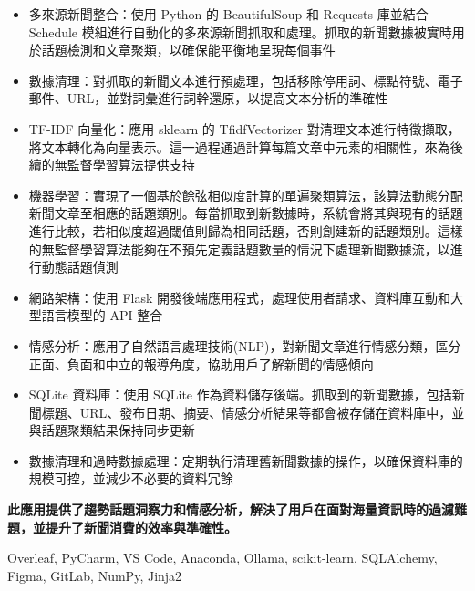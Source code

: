 \documentclass[11 pt,oneside,a4paper,titlepage]{article}
\begin{document}
{\begin{minipage}{20.4cm}
    {\begin{multicols}{2}
    \begin{itemize}[label=\Large\textbullet, left=0pt]
        \item 多來源新聞整合：使用 Python 的 BeautifulSoup 和 Requests 庫並結合 Schedule 模組進行自動化的多來源新聞抓取和處理。抓取的新聞數據被實時用於話題檢測和文章聚類，以確保能平衡地呈現每個事件
        \item 數據清理：對抓取的新聞文本進行預處理，包括移除停用詞、標點符號、電子郵件、URL，並對詞彙進行詞幹還原，以提高文本分析的準確性
        \item TF-IDF 向量化：應用 sklearn 的 TfidfVectorizer 對清理文本進行特徵擷取，將文本轉化為向量表示。這一過程通過計算每篇文章中元素的相關性，來為後續的無監督學習算法提供支持
        \item 機器學習：實現了一個基於餘弦相似度計算的單遍聚類算法，該算法動態分配新聞文章至相應的話題類別。每當抓取到新數據時，系統會將其與現有的話題進行比較，若相似度超過閾值則歸為相同話題，否則創建新的話題類別。這樣的無監督學習算法能夠在不預先定義話題數量的情況下處理新聞數據流，以進行動態話題偵測
        \item 網路架構：使用 Flask 開發後端應用程式，處理使用者請求、資料庫互動和大型語言模型的 API 整合
        \item 情感分析：應用了自然語言處理技術(NLP)，對新聞文章進行情感分類，區分正面、負面和中立的報導角度，協助用戶了解新聞的情感傾向
        \item SQLite 資料庫：使用 SQLite 作為資料儲存後端。抓取到的新聞數據，包括新聞標題、URL、發布日期、摘要、情感分析結果等都會被存儲在資料庫中，並與話題聚類結果保持同步更新
        \item 數據清理和過時數據處理：定期執行清理舊新聞數據的操作，以確保資料庫的規模可控，並減少不必要的資料冗餘
    \end{itemize}
    \end{multicols}
    \textbf{此應用提供了趨勢話題洞察力和情感分析，解決了用戶在面對海量資訊時的過濾難題，並提升了新聞消費的效率與準確性。}}
    { Overleaf, PyCharm, VS Code, Anaconda, Ollama, scikit-learn, SQLAlchemy, Figma, GitLab, NumPy, Jinja2}


\end{minipage}}
\end{document}

